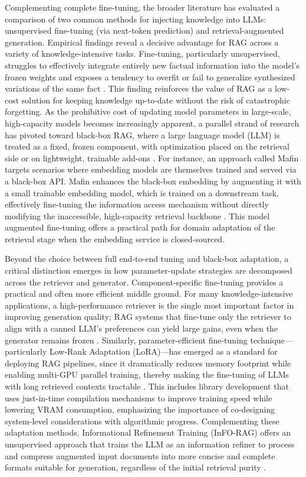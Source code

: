 \documentclass[11pt]{article}
\begin{document}
Complementing complete fine-tuning, the broader literature has evaluated a comparison of two common methods for injecting knowledge into LLMs: unsupervised fine-tuning (via next-token prediction) and retrieval-augmented generation. Empirical findings reveal a decisive advantage for RAG across a variety of knowledge-intensive tasks. Fine-tuning, particularly unsupervised, struggles to effectively integrate entirely new factual information into the model's frozen weights and exposes a tendency to overfit or fail to generalize synthesized variations of the same fact \cite{ref74}. This finding reinforces the value of RAG as a low-cost solution for keeping knowledge up-to-date without the risk of catastrophic forgetting. As the prohibitive cost of updating model parameters in large-scale, high-capacity models becomes increasingly apparent, a parallel strand of research has pivoted toward black-box RAG, where a large language model (LLM) is treated as a fixed, frozen component, with optimization placed on the retrieval side or on lightweight, trainable add-ons \cite{ref75}. For instance, an approach called Mafin targets scenarios where embedding models are themselves trained and served via a black-box API. Mafin enhances the black-box embedding by augmenting it with a small trainable embedding model, which is trained on a downstream task, effectively fine-tuning the information access mechanism without directly modifying the inaccessible, high-capacity retrieval backbone \cite{ref54}. This model augmented fine-tuning offers a practical path for domain adaptation of the retrieval stage when the embedding service is closed-sourced.

Beyond the choice between full end-to-end tuning and black-box adaptation, a critical distinction emerges in how parameter-update strategies are decomposed across the retriever and generator. Component-specific fine-tuning provides a practical and often more efficient middle ground. For many knowledge-intensive applications, a high-performance retriever is the single most important factor in improving generation quality; RAG systems that fine-tune only the retriever to align with a canned LLM's preferences can yield large gains, even when the generator remains frozen \cite{ref75}. Similarly, parameter-efficient fine-tuning technique---particularly Low-Rank Adaptation (LoRA)---has emerged as a standard for deploying RAG pipelines, since it dramatically reduces memory footprint while enabling multi-GPU parallel training, thereby making the fine-tuning of LLMs with long retrieved contexts tractable \cite{ref60}. This includes library development that uses just-in-time compilation mechanisms to improve training speed while lowering VRAM consumption, emphasizing the importance of co-designing system-level considerations with algorithmic progress. Complementing these adaptation methods, Informational Refinement Training (InFO-RAG) offers an unsupervised approach that trains the LLM as an information refiner to process and compress augmented input documents into more concise and complete formats suitable for generation, regardless of the initial retrieval purity \cite{ref52}.
\end{document}
